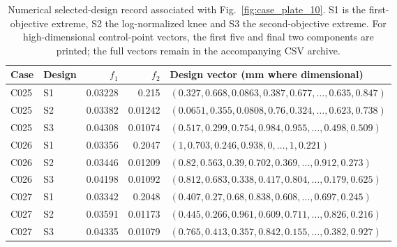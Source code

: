 \begin{table}[p]
\centering\scriptsize
\caption{Numerical selected-design record associated with Fig.~\ref{fig:case_plate_10}. S1 is the first-objective extreme, S2 the log-normalized knee and S3 the second-objective extreme. For high-dimensional control-point vectors, the first five and final two components are printed; the full vectors remain in the accompanying CSV archive.}
\label{tab:case_plate_10}
\setlength{\tabcolsep}{3.2pt}
\begin{tabularx}{\textwidth}{llrr>{\raggedright\arraybackslash}X}
\toprule Case & Design & $f_1$ & $f_2$ & Design vector (mm where dimensional) \\
\midrule
C025 & S1 & 0.03228 & 0.215 & $(0.327, 0.668, 0.0863, 0.387, 0.677, \ldots, 0.635, 0.847)$ \\
C025 & S2 & 0.03382 & 0.01242 & $(0.0651, 0.355, 0.0808, 0.76, 0.324, \ldots, 0.623, 0.738)$ \\
C025 & S3 & 0.04308 & 0.01074 & $(0.517, 0.299, 0.754, 0.984, 0.955, \ldots, 0.498, 0.509)$ \\
C026 & S1 & 0.03356 & 0.2047 & $(1, 0.703, 0.246, 0.938, 0, \ldots, 1, 0.221)$ \\
C026 & S2 & 0.03446 & 0.01209 & $(0.82, 0.563, 0.39, 0.702, 0.369, \ldots, 0.912, 0.273)$ \\
C026 & S3 & 0.04198 & 0.01092 & $(0.812, 0.683, 0.338, 0.417, 0.804, \ldots, 0.179, 0.625)$ \\
C027 & S1 & 0.03342 & 0.2048 & $(0.407, 0.27, 0.68, 0.838, 0.608, \ldots, 0.697, 0.245)$ \\
C027 & S2 & 0.03591 & 0.01173 & $(0.445, 0.266, 0.961, 0.609, 0.711, \ldots, 0.826, 0.216)$ \\
C027 & S3 & 0.04335 & 0.01079 & $(0.765, 0.413, 0.357, 0.842, 0.155, \ldots, 0.382, 0.927)$ \\
\bottomrule
\end{tabularx}
\end{table}
